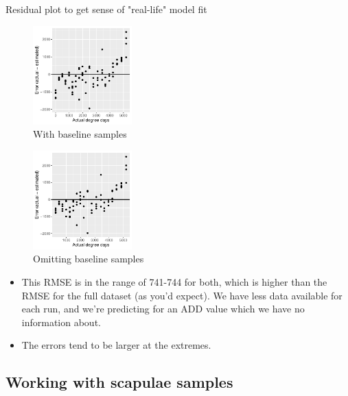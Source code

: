 \documentclass{beamer}
\begin{document}
\begin{frame}{Residual plot to get sense of "real-life" model fit}

  \begin{minipage}{0.47\textwidth}
  \begin{figure}
      \includegraphics[width=1.5in]{HenleyLake/bacteria/use_families/w_ribs/w_baseline/leave_out_one_rib_and_one_day_residuals}
      \caption{With baseline samples}
  \end{figure}
  \end{minipage}  
  \begin{minipage}{0.47\textwidth}
  \begin{figure}
      \includegraphics[width=1.5in]{HenleyLake/bacteria/use_families/w_ribs/no_baseline/leave_out_one_rib_and_one_day_residuals}
      \caption{Omitting baseline samples}
  \end{figure}
  \end{minipage}
    \vspace{0.1in}
{\scriptsize
\begin{itemize}
  \item This RMSE is in the range of 741-744 for both, which is
    higher than the RMSE for the full dataset (as you'd expect).  We
    have less data available for each run, and we're predicting for an
    ADD value which we have no information about.
  \item The errors tend to be larger at the extremes.
\end{itemize}
}

\end{frame}



\subsection[Scapulae]{Working with scapulae samples}
\end{document}
